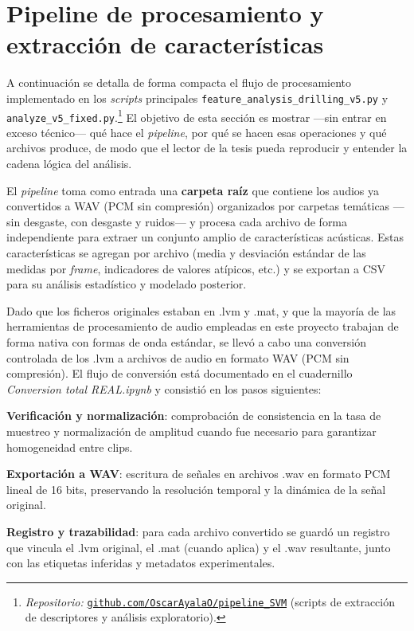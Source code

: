 \documentclass[12pt, letterpaper]{report}
\begin{document}
\section{Pipeline de procesamiento y extracción de características}

A continuación se detalla de forma compacta el flujo de procesamiento implementado en los \textit{scripts} principales \texttt{feature\_analysis\_drilling\_v5.py} y \texttt{analyze\_v5\_fixed.py}.\footnote{\textit{Repositorio:} \href{https://github.com/OscarAyalaO/pipeline_SVM}{\texttt{github.com/OscarAyalaO/pipeline\_SVM}} (scripts de extracción de descriptores y análisis exploratorio).} El objetivo de esta sección es mostrar ---sin entrar en exceso técnico--- qué hace el \textit{pipeline}, por qué se hacen esas operaciones y qué archivos produce, de modo que el lector de la tesis pueda reproducir y entender la cadena lógica del análisis.

El \textit{pipeline} toma como entrada una \textbf{carpeta raíz} que contiene los audios ya convertidos a WAV (PCM sin compresión) organizados por carpetas temáticas ---sin desgaste, con desgaste y ruidos--- y procesa cada archivo de forma independiente para extraer un conjunto amplio de características acústicas. Estas características se agregan por archivo (media y desviación estándar de las medidas por \textit{frame}, indicadores de valores atípicos, etc.) y se exportan a CSV para su análisis estadístico y modelado posterior.

Dado que los ficheros originales estaban en .lvm y .mat, y que la mayoría de las herramientas de procesamiento de audio empleadas en este proyecto trabajan de forma nativa con formas de onda estándar, se llevó a cabo una conversión controlada de los .lvm a archivos de audio en formato WAV (PCM sin compresión). El flujo de conversión está documentado en el cuadernillo \textit{Conversion total REAL.ipynb}  y consistió en los pasos siguientes:

\textbf{Verificación y normalización}: comprobación de consistencia en la tasa de muestreo y normalización de amplitud cuando fue necesario para garantizar homogeneidad entre clips.

\textbf{Exportación a WAV}: escritura de señales en archivos .wav en formato PCM lineal de 16 bits, preservando la resolución temporal y la dinámica de la señal original.

\textbf{Registro y trazabilidad}: para cada archivo convertido se guardó un registro que vincula el .lvm original, el .mat (cuando aplica) y el .wav resultante, junto con las etiquetas inferidas y metadatos experimentales.
\end{document}
